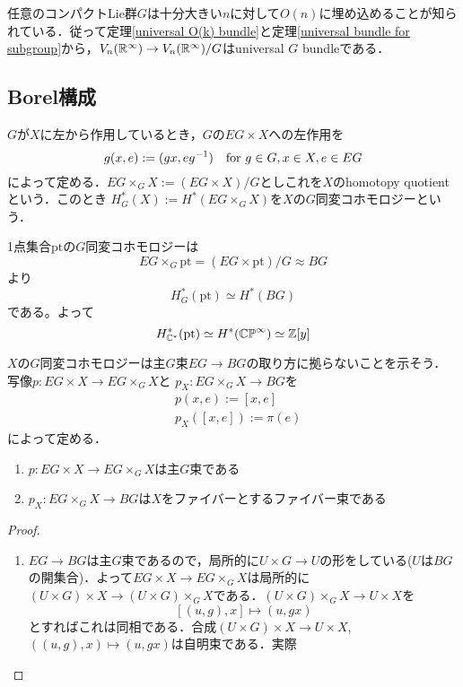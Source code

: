 任意のコンパクトLie群$G$は十分大きい$n$に対して$O(n)$に埋め込めることが知られている\cite{representation}．従って定理\ref{universal O(k) bundle}と定理\ref{universal bundle for subgroup}から，$V_n(\mathbb{R}^\infty)\rightarrow V_n(\mathbb{R}^\infty)/G$はuniversal $G$ bundleである．





\subsection{Borel構成}

\begin{defin}
  $G$が$X$に左から作用しているとき，$G$の$EG\times X$への左作用を
  \[
  g(x, e):=(gx, eg^{-1}) \quad \text{for } g\in G, x\in X, e\in EG 
  \]
  によって定める．$EG\times_GX:=(EG\times X)/G$としこれを$X$のhomotopy quotient という．このとき
  $H^*_G(X):=H^*(EG\times_GX)$を$X$の$G$同変コホモロジーという．
\end{defin}

\begin{eg}
  1点集合$\text{pt}$の$G$同変コホモロジーは
  \[
  EG\times_G\text{pt}=(EG\times \text{pt})/G\approx BG
  \]
  より
  \[
  H^*_G(\text{pt})\simeq H^*(BG)
  \]
  である。よって
  \[
  H^*_{\mathbb{C}^*}(\text{pt})\simeq H^*(\mathbb{CP}^\infty)\simeq \mathbb{Z}[y]
  \]
\end{eg}


$X$の$G$同変コホモロジーは主$G$束$EG\rightarrow BG$の取り方に拠らないことを示そう．
写像$p\colon EG\times X\rightarrow EG\times_GX$と $p_X\colon EG\times_GX\rightarrow BG$を
\begin{align*}
  &p(x, e):=[x, e]\\
  &p_X([x, e]):=\pi(e)
\end{align*}
によって定める．

\begin{prop}
  \:
  \begin{enumerate}
    \item $p\colon EG\times X\rightarrow EG\times_GX$は主$G$束である
    \item $p_X\colon EG\times_GX\rightarrow BG$は$X$をファイバーとするファイバー束である
  \end{enumerate}
\end{prop}

\begin{proof}
  \:
  \begin{enumerate}
    \item $EG\rightarrow BG$は主$G$束であるので，局所的に$U\times G\rightarrow U$の形をしている($U$は$BG$の開集合)．よって$EG\times X\rightarrow EG\times_G X$は局所的に$(U\times G)\times X\rightarrow (U\times G)\times_GX$である．$(U\times G)\times_GX\rightarrow U\times X$を
    \[
    [(u,g),x] \mapsto (u,gx)
    \]
    とすればこれは同相である．合成$(U\times G)\times X\rightarrow U\times X$, $((u,g),x)\mapsto (u,gx)$は自明束である．実際
  \end{enumerate}
\end{proof}

